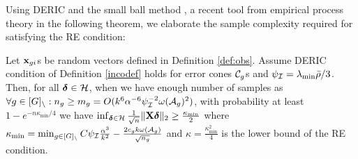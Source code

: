 %


 Using DERIC and the small ball method \cite{mend15}, a recent tool from empirical process theory in the following theorem, we elaborate the sample complexity required for satisfying the RE condition:
\begin{theorem}
	\label{theo:re}
	Let $\mathbf{x}_{gi}$s	be random vectors defined in Definition \ref{def:obs}.
	Assume DERIC condition of Definition \ref{incodef} holds for error cones ${\cal C}_g$s and $\psi_{{\cal{I}}}=\lambda_{\min}\bar{\rho}/3$.
	Then, for all $\boldsymbol{\delta} \in {\cal H}$, when we have enough number of samples as $\forall g \in [G]_{\setminus}: n_g \geq m_g = O(k^6 \alpha^{-6} \psi_{{\cal{I}}}^{-2} \omega({\cal A}_g)^2)$, with probability at least $1 - e^{-n \kappa_{\min}/4}$  we have 
	$\inf_{\boldsymbol{\delta} \in {\cal H}} \frac{1}{\sqrt{n}} \|\mathbf{X} \boldsymbol{\delta}\|_{2} \geq \frac{\kappa_{\min}}{2}$
	where $\kappa_{\min} = \min_{g\in [G]_\setminus} C \psi_{{\cal{I}}} \frac{\alpha^3}{k^2}  - \frac{2 c_g k \omega({\cal A}_g)}{\sqrt{n_g}}$ and $\kappa = \frac{\kappa_{\min}^2}{4}$ is the lower bound of the RE condition.
\end{theorem}

